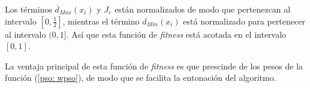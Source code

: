     Los términos $\overline{d}_{Max}(x_i)$ y $J_e$ están normalizados de modo que
pertenezcan al intervalo $[0, \frac{1}{2}]$, mientras el término $d_{Min}(x_i)$
está normalizado para pertenecer al intervalo $(0, 1]$. Así que esta función de
\emph{fitness} está acotada en el intervalo $[0, 1]$.

    La ventaja principal de esta función de \emph{fitness} es que prescinde de
los pesos de la función (\ref{pso: wpso}), de modo que se facilita la
entonación del algoritmo.


